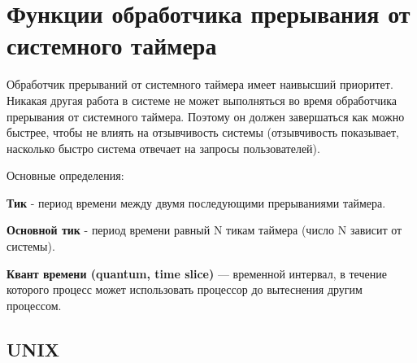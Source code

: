 \chapter{Функции обработчика прерывания от системного таймера}

Обработчик прерываний от системного таймера имеет наивысший приоритет. Никакая другая работа в системе не может выполняться во время обработчика прерывания от системного таймера. Поэтому он должен завершаться как можно быстрее, чтобы не влиять на отзывчивость системы (отзывчивость показывает, насколько
быстро система отвечает на запросы пользователей).

Основные определения:

\textbf{Тик} - период времени между двумя последующими прерываниями таймера.

\textbf{Основной тик} - период времени равный N тикам таймера (число N
зависит от системы).

\textbf{Квант времени (quantum, time slice)} — временной интервал, в течение которого процесс может использовать процессор до вытеснения другим процессом.

\section{UNIX}

